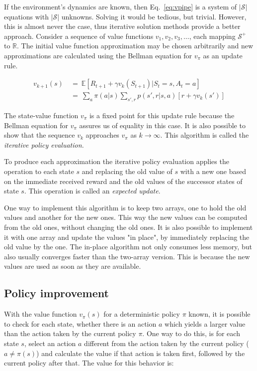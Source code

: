 If the environment's dynamics are known, then Eq.~\ref{eq:vpipe} is a system of $|\mathcal{S}|$ equations with $|\mathcal{S}|$ unknowns.
Solving it would be tedious, but trivial.
However, this is almost never the case, thus iterative solution methods provide a better approach.
Consider a sequence of value functions $v_1, v_2, v_3, \dots$, each mapping $\mathcal{S}^+$ to $\mathbb{R}$.
The initial value function approximation may be chosen arbitrarily and new approximations are calculated using the Bellman equation for $v_\pi$ as an update rule.

\begin{equation}
  \begin{aligned}
    v_{k+1}(s) \ &=\ \mathbb{E} \left [ R_{t+1} + \gamma v_k(S_{t+1}) | S_t=s, A_t=a \right ] \\
                 &=\ \sum_{a} \pi (a|s) \sum_{s', r} p(s',r|s,a) \left [ r+\gamma v_k(s') \right ]
    \label{eq:vpipe_update}
  \end{aligned}
\end{equation}

The state-value function $v_\pi$ is a fixed point for this update rule because the Bellman equation for $v_\pi$ assures us of equality in this case.
It is also possible to show that the sequence ${v_k}$ approaches $v_\pi$ as $k \rightarrow \infty$.
This algorithm is called the \emph{iterative policy evaluation.}

To produce each approximation the iterative policy evaluation applies the operation to each state $s$ and replacing the old value of $s$ with a new one based on the immediate received reward and the old values of the successor states of state $s$.
This operation is called an \emph{expected update}.

One way to implement this algorithm is to keep two arrays, one to hold the old values and another for the new ones.
This way the new values can be computed from the old ones, without changing the old ones.
It is also possible to implement it with one array and update the values "in place", by immediately replacing the old value by the one.
The in-place algorithm not only consumes less memory, but also usually converges faster than the two-array version.
This is because the new values are used as soon as they are available.


\subsection{Policy improvement}
With the value function $v_\pi(s)$ for a deterministic policy $\pi$ known, it is possible to check for each state, whether there is an action $a$ which yields a larger value than the action taken by the current policy $\pi$.
One way to do this, is for each state $s$, select an action $a$ different from the action taken by the current policy ($a \neq \pi(s)$) and calculate the value if that action is taken first, followed by the current policy after that.
The value for this behavior is:

